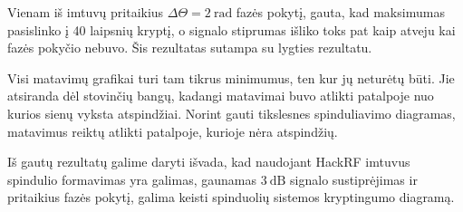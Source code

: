 \documentclass[main.tex]{subfiles}
\begin{document}
Vienam iš imtuvų pritaikius $\Delta \Theta = 2\ \mathrm{rad}$ fazės pokytį, gauta, kad
maksimumas pasislinko į 40 laipsnių kryptį, o signalo stiprumas išliko toks pat kaip atveju
kai fazės pokyčio
nebuvo. Šis rezultatas sutampa su  lygties rezultatu.

Visi matavimų grafikai turi tam tikrus minimumus, ten kur jų neturėtų būti. Jie atsiranda
dėl stovinčių bangų, kadangi matavimai buvo atlikti patalpoje nuo kurios sienų vyksta
atspindžiai. Norint gauti tikslesnes spinduliavimo diagramas, matavimus reiktų
atlikti patalpoje, kurioje nėra atspindžių.

Iš gautų rezultatų galime daryti išvada, kad naudojant HackRF imtuvus spindulio formavimas
yra galimas, gaunamas $3\ \mathrm{dB}$ signalo sustiprėjimas ir pritaikius fazės pokytį,
galima keisti spinduolių sistemos kryptingumo diagramą.
\end{document}
